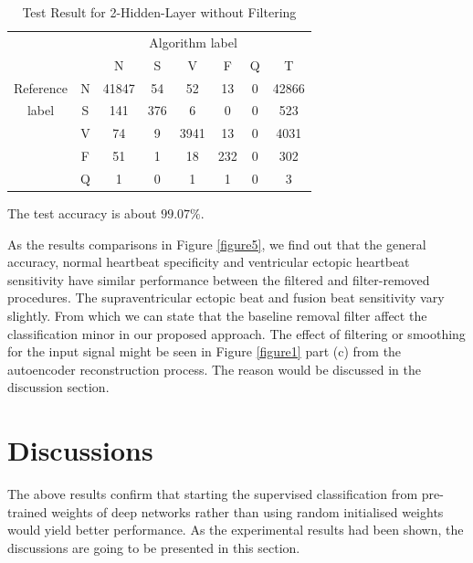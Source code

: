 \documentclass[journal]{IEEEtran}
\begin{document}
\begin{table}[!htbp]
\begin{center}
\begin{threeparttable}
\caption{Test Result for 2-Hidden-Layer without Filtering}
\label{table8}
\begin{tabular}{cccccccc}
\hline
\multicolumn{6}{r}{Algorithm label} \\
\cline{3-7}
&  & N & S & V & F & Q & T\\
\hline
 Reference & N & 41847 & 54   & 52   & 13  & 0  &  42866 \\
	label & S & 141   & 376  & 6    & 0   & 0  &  523\\
		   & V & 74    & 9    & 3941 & 13  & 0  &  4031\\
			   &F & 51    & 1    & 18   & 232  & 0  &  302\\
			  & Q & 1     & 0    & 1    & 1   & 0  &  3\\
\hline
\end{tabular}
\begin{tablenotes}
\item The test accuracy is about $99.07\%$.
\end{tablenotes}
\end{threeparttable}
\end{center}
\end{table}


As the results comparisons in Figure \ref{figure5}, we find out that the general accuracy, normal heartbeat specificity and ventricular ectopic heartbeat sensitivity have similar performance between the filtered and filter-removed procedures. The supraventricular ectopic beat and fusion beat sensitivity vary slightly. From which we can state that the baseline removal filter affect the classification minor in our proposed approach. The effect of filtering or smoothing for the input signal might be seen in Figure \ref{figure1} part (c) from the autoencoder reconstruction process. The reason would be discussed in the discussion section.


\section{Discussions}

The above results confirm that starting the supervised classification from pre-trained weights of deep networks rather than using random initialised weights would yield better performance.
As the experimental results had been shown, the discussions are going to be presented in this section.
\end{document}
